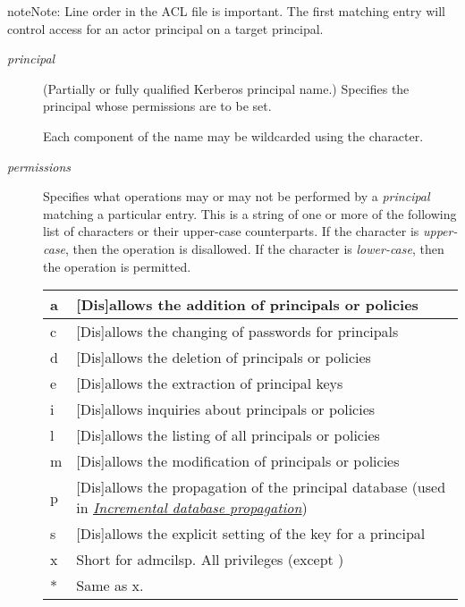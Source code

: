 \documentclass[letterpaper,10pt,english]{sphinxmanual}
\begin{document}
\begin{notice}{note}{Note:}
Line order in the ACL file is important.  The first matching entry
will control access for an actor principal on a target principal.
\end{notice}
\begin{description}
\item[{\emph{principal}}] \leavevmode
(Partially or fully qualified Kerberos principal name.) Specifies
the principal whose permissions are to be set.

Each component of the name may be wildcarded using the \code{*}
character.

\item[{\emph{permissions}}] \leavevmode
Specifies what operations may or may not be performed by a
\emph{principal} matching a particular entry.  This is a string of one or
more of the following list of characters or their upper-case
counterparts.  If the character is \emph{upper-case}, then the operation
is disallowed.  If the character is \emph{lower-case}, then the operation
is permitted.

\begin{tabulary}{\linewidth}{|L|L|}
\hline

a
 & 
{[}Dis{]}allows the addition of principals or policies
\\
\hline
c
 & 
{[}Dis{]}allows the changing of passwords for principals
\\
\hline
d
 & 
{[}Dis{]}allows the deletion of principals or policies
\\
\hline
e
 & 
{[}Dis{]}allows the extraction of principal keys
\\
\hline
i
 & 
{[}Dis{]}allows inquiries about principals or policies
\\
\hline
l
 & 
{[}Dis{]}allows the listing of all principals or policies
\\
\hline
m
 & 
{[}Dis{]}allows the modification of principals or policies
\\
\hline
p
 & 
{[}Dis{]}allows the propagation of the principal database (used in {\hyperref[admin/database:incr-db-prop]{\emph{Incremental database propagation}}})
\\
\hline
s
 & 
{[}Dis{]}allows the explicit setting of the key for a principal
\\
\hline
x
 & 
Short for admcilsp. All privileges (except )
\\
\hline
*
 & 
Same as x.
\\
\hline\end{tabulary}


\end{description}
\end{document}
